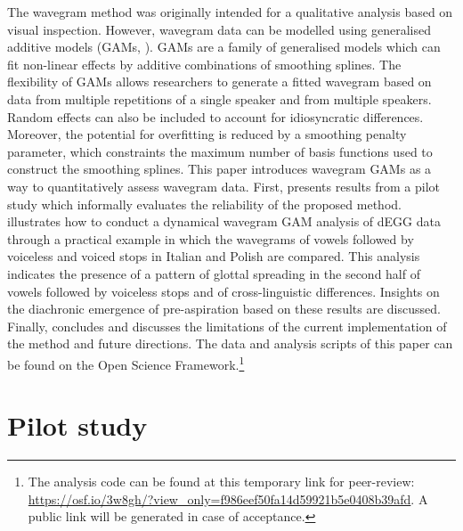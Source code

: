 \documentclass[
  11pt,
  a4paper,
]{article}
\begin{document}
The wavegram method was originally intended for a qualitative analysis
based on visual inspection. However, wavegram data can be modelled using
generalised additive models (GAMs,
\citealt{hastie1986, zuur2012, wood2017}). GAMs are a family of
generalised models which can fit non-linear effects by additive
combinations of smoothing splines. The flexibility of GAMs allows
researchers to generate a fitted wavegram based on data from multiple
repetitions of a single speaker and from multiple speakers. Random
effects can also be included to account for idiosyncratic differences.
Moreover, the potential for overfitting is reduced by a smoothing
penalty parameter, which constraints the maximum number of basis
functions used to construct the smoothing splines. This paper introduces
wavegram GAMs as a way to quantitatively assess wavegram data. First,
 presents results from a pilot study which informally
evaluates the reliability of the proposed method. 
illustrates how to conduct a dynamical wavegram GAM analysis of dEGG
data through a practical example in which the wavegrams of vowels
followed by voiceless and voiced stops in Italian and Polish are
compared. This analysis indicates the presence of a pattern of glottal
spreading in the second half of vowels followed by voiceless stops and
of cross-linguistic differences. Insights on the diachronic emergence of
pre-aspiration based on these results are discussed. Finally,
 concludes and discusses the limitations of the
current implementation of the method and future directions. The data
\citep{coretta2017e, coretta2018m} and analysis scripts of this paper
can be found on the Open Science
Framework.\footnote{The analysis code can be found at this temporary link for peer-review: \url{https://osf.io/3w8gh/?view_only=f986eef50fa14d59921b5e0408b39afd}. A public link will be generated in case of acceptance.}

\hypertarget{pilot-study}{%
\section{Pilot study}\label{pilot-study}}

\label{s:pilot}
\end{document}
